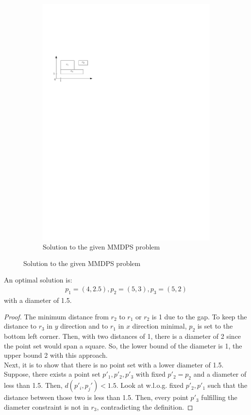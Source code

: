 \documentclass[a4paper,12pt,headsepline]{scrartcl}
\begin{document}
\begin{enumerate}[a)]
\begin{figure}[H]
\begin{subfigure}{0.48\textwidth}
			\includegraphics[width=1\linewidth,page=2]{graphics/7_2.pdf}
			\caption*{Solution to the given MMDPS problem}
		\end{subfigure}
	\end{figure}
An optimal solution is:
\begin{align*}
	p_1 = (4,2.5), p_2 = (5,3), p_3 = (5,2)
\end{align*}
with a diameter of 1.5.
\begin{proof}
	The minimum distance from $r_2$ to $r_1$ or $r_2$ is 1 due to the gap. To keep the distance to $r_3$ in $y$ direction and to $r_1$ in $x$ direction minimal, $p_2$ is set to the bottom left corner. Then, with two distances of 1, there is a diameter of 2 since the point set would span a square. So, the lower bound of the diameter is 1, the upper bound 2 with this approach.\\
	Next, it is to show that there is no point set with a lower diameter of 1.5. Suppose, there exists a point set $p'_1,p'_2, p'_3$ with fixed $p'_2 = p_2$ and a diameter of less than 1.5. Then, $d(p'_i,p_j') < 1.5$. Look at w.l.o.g. fixed $p'_2, p'_1$ such that the distance between those two is less than 1.5. Then, every point $p'_3$ fulfilling the diameter constraint is not in $r_3$, contradicting the definition.

\end{proof}
\end{enumerate}
\end{document}
